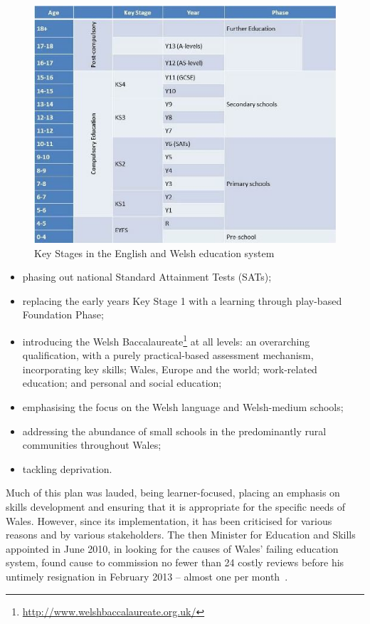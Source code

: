 \begin{figure}[!ht]
  \centering
  \includegraphics[width=0.9\columnwidth]{images/keystages.png}
  \caption{Key Stages in the English and Welsh education system}
  \label{fig:key-stages}
\end{figure}

\begin{itemize}
\item phasing out national Standard Attainment Tests (SATs);
\item replacing the early years Key Stage 1 with a learning through
play-based Foundation Phase;
\item introducing the Welsh
Baccalaureate\footnote{\url{http://www.welshbaccalaureate.org.uk/}} at
all levels: an overarching qualification, with a purely
practical-based assessment mechanism, incorporating key skills; Wales,
Europe and the world; work-related education; and personal and social
education;
\item emphasising the focus on the Welsh language and Welsh-medium
schools;
\item addressing the abundance of small schools in the predominantly
rural communities throughout Wales;
\item tackling deprivation.
\end{itemize}

Much of this plan was lauded, being learner-focused, placing an
emphasis on skills development and ensuring that it is appropriate for
the specific needs of Wales. However, since its implementation, it has
been criticised for various reasons and by various stakeholders.  The
then Minister for Education and Skills appointed in June 2010, in
looking for the causes of Wales' failing education system, found cause
to commission no fewer than 24 costly reviews before his untimely
resignation in February 2013 -- almost one per
month~\cite{Evans:2015}.

